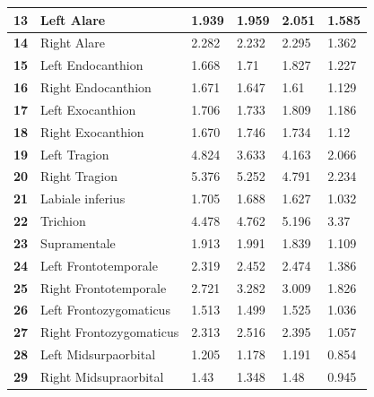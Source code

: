 \begin{table}[!ht]
\begin{tabular}{|l|l|l|l|l|l|}
                \textbf{13} & Left Alare & 1.939 & 1.959 & 2.051 & \cellcolor{green!25}1.585 \\ \hline
                \textbf{14} & Right Alare & 2.282 & 2.232 & 2.295 & \cellcolor{green!25}1.362 \\ \hline
                \textbf{15} & Left Endocanthion & 1.668 & 1.71 & 1.827 & \cellcolor{green!25}1.227 \\ \hline
                \textbf{16} & Right Endocanthion & 1.671 & 1.647 & 1.61 & \cellcolor{green!25}1.129 \\ \hline
                \textbf{17} & Left Exocanthion & 1.706 & 1.733 & 1.809 & \cellcolor{green!25}1.186 \\ \hline
                \textbf{18} & Right Exocanthion & 1.670 & 1.746 & 1.734 & \cellcolor{green!25}1.12 \\ \hline
                \textbf{19} & Left Tragion & 4.824 & 3.633 & 4.163 & \cellcolor{green!25}2.066 \\ \hline
                \textbf{20} & Right Tragion & 5.376 & 5.252 & 4.791 & \cellcolor{green!25}2.234 \\ \hline
                \textbf{21} & Labiale inferius & 1.705 & 1.688 & 1.627 & \cellcolor{green!25}1.032 \\ \hline
                \textbf{22} & Trichion & 4.478 & 4.762 & 5.196 & \cellcolor{green!25} 3.37 \\ \hline
                \textbf{23} & Supramentale & 1.913 & 1.991 & 1.839 & \cellcolor{green!25}1.109 \\ \hline
                \textbf{24} & Left Frontotemporale & 2.319 & 2.452 & 2.474 & \cellcolor{green!25}1.386 \\ \hline
                \textbf{25} & Right Frontotemporale & 2.721 & 3.282 & 3.009 & \cellcolor{green!25}1.826 \\ \hline
                \textbf{26} & Left Frontozygomaticus & 1.513 & 1.499 & 1.525 & \cellcolor{green!25}1.036 \\ \hline
                \textbf{27} & Right Frontozygomaticus & 2.313 & 2.516 & 2.395 & \cellcolor{green!25}1.057 \\ \hline
                \textbf{28} & Left Midsurpaorbital & 1.205 & 1.178 & 1.191 & \cellcolor{green!25}0.854 \\ \hline
                \textbf{29} & Right Midsupraorbital & 1.43 & 1.348 & 1.48 & \cellcolor{green!25}0.945 \\ \hline
            \end{tabular}
            \label{table:Daugmentation_landmarksresume}
        \end{table}
        \medskip

